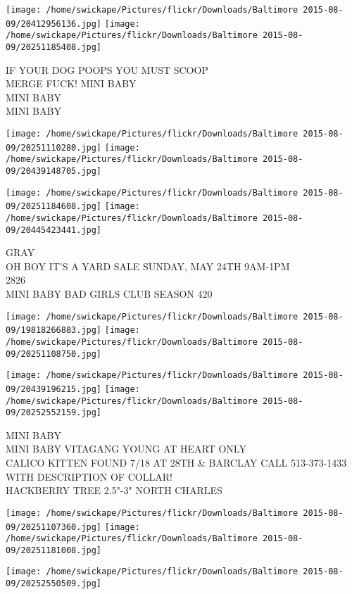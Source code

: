 \documentclass[10pt,letterpaper]{article}
\begin{document}
\texttt{[image: /home/swickape/Pictures/flickr/Downloads/Baltimore 2015-08-09/20412956136.jpg]}
\texttt{[image: /home/swickape/Pictures/flickr/Downloads/Baltimore 2015-08-09/20251185408.jpg]}

IF YOUR DOG POOPS YOU MUST SCOOP\\
MERGE FUCK! MINI BABY\\
MINI BABY\\
MINI BABY\\
\pagebreak

\texttt{[image: /home/swickape/Pictures/flickr/Downloads/Baltimore 2015-08-09/20251110280.jpg]}
\texttt{[image: /home/swickape/Pictures/flickr/Downloads/Baltimore 2015-08-09/20439148705.jpg]}

\texttt{[image: /home/swickape/Pictures/flickr/Downloads/Baltimore 2015-08-09/20251184608.jpg]}
\texttt{[image: /home/swickape/Pictures/flickr/Downloads/Baltimore 2015-08-09/20445423441.jpg]}

GRAY\\
OH BOY IT'S A YARD SALE SUNDAY, MAY 24TH 9AM{-}1PM\\
2826\\
MINI BABY BAD GIRLS CLUB SEASON 420\\
\pagebreak

\texttt{[image: /home/swickape/Pictures/flickr/Downloads/Baltimore 2015-08-09/19818266883.jpg]}
\texttt{[image: /home/swickape/Pictures/flickr/Downloads/Baltimore 2015-08-09/20251108750.jpg]}

\texttt{[image: /home/swickape/Pictures/flickr/Downloads/Baltimore 2015-08-09/20439196215.jpg]}
\texttt{[image: /home/swickape/Pictures/flickr/Downloads/Baltimore 2015-08-09/20252552159.jpg]}

MINI BABY\\
MINI BABY VITAGANG YOUNG AT HEART ONLY\\
CALICO KITTEN FOUND 7/18 AT 28TH \& BARCLAY CALL 513{-}373{-}1433 WITH DESCRIPTION OF COLLAR!\\
HACKBERRY TREE 2.5"{-}3" NORTH CHARLES\\
\pagebreak

\texttt{[image: /home/swickape/Pictures/flickr/Downloads/Baltimore 2015-08-09/20251107360.jpg]}
\texttt{[image: /home/swickape/Pictures/flickr/Downloads/Baltimore 2015-08-09/20251181008.jpg]}

\texttt{[image: /home/swickape/Pictures/flickr/Downloads/Baltimore 2015-08-09/20252550509.jpg]}
\end{document}
